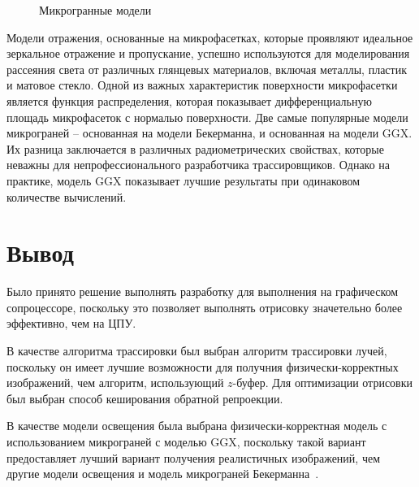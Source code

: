 \begin{figure}[!ht]
  \centering
  
  \caption{Микрогранные модели}
\end{figure}

Модели отражения, основанные на микрофасетках, которые проявляют идеальное 
зеркальное отражение и пропускание, успешно используются для моделирования 
рассеяния света от различных глянцевых материалов, включая металлы, пластик 
и матовое стекло.
Одной из важных характеристик поверхности микрофасетки является функция 
распределения, которая показывает дифференциальную площадь микрофасеток 
с нормалью поверхности. Две самые популярные модели микрограней -- 
основанная на модели Бекерманна, и основанная на модели GGX. Их разница 
заключается в различных радиометрических свойствах, которые неважны
для непрофессионального разработчика трассировщиков. Однако на практике,
модель GGX показывает лучшие результаты при одинаковом количестве вычислений.
~\cite{PBRT3e}~\cite{MMfRtRS}

\section{Вывод}

Было принято решение выполнять разработку для выполнения на графическом сопроцессоре,
поскольку это позволяет выполнять отрисовку значетельно более эффективно, чем на ЦПУ.

В качестве алгоритма трассировки был выбран алгоритм трассировки лучей, поскольку он имеет
лучшие возможности для получния физически-корректных изображений, чем 
алгоритм, использующий $z$-буфер.
Для оптимизации отрисовки был выбран способ кеширования 
обратной репроекции.

В качестве модели освещения была выбрана физически-корректная модель с использованием
микрограней с моделью GGX, поскольку такой вариант предоставляет лучший вариант
получения реалистичных изображений, чем другие модели освещения и модель микрограней Бекерманна~\cite{MMfRtRS}.
